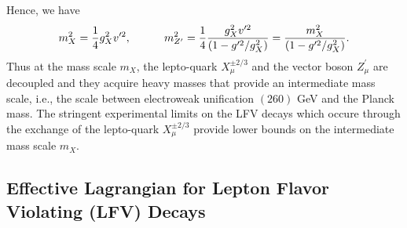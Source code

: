 \documentclass{ws-ijmpa}
\begin{document}
Hence, we have
\begin{eqnarray}
m_X^{2}={1\over4}g_X^{2}v^{\prime2}, \quad\quad\quad m^{2}_{Z^{\prime}}={1\over4}\frac{g_X^{2}v^{\prime 2}}{(1-g^{\prime
2}/g_X^2)}= \frac{m_X^{2}}{(1-g^{\prime 2}/g_X^2)}\label{8p}.
\end{eqnarray}
Thus at the mass scale $m_{X}$, the lepto-quark  $X_{\mu}^{\pm 2/3}$ and the vector boson $Z^{\prime}_\mu$ are decoupled and they acquire heavy masses that provide an intermediate mass scale, i.e., the scale between electroweak unification $(260)$ GeV and the Planck mass. The
stringent experimental limits on the LFV decays which occure through the exchange of the lepto-quark $X_{\mu}^{\pm 2/3}$ provide
lower bounds on the intermediate mass scale $m_{X}$.

\subsection{Effective Lagrangian for Lepton Flavor Violating (LFV) Decays}
\end{document}
